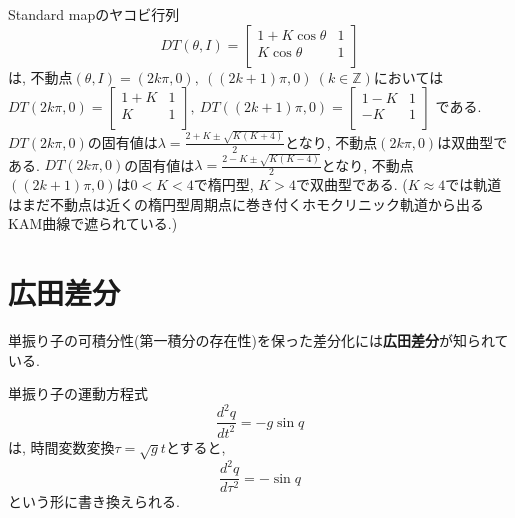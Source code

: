 \documentclass[a4paper]{ujarticle}
\numberwithin{equation}{section}
\theoremstyle{definition}
\begin{document}
    Standard mapのヤコビ行列
    \[
        DT(\theta, I) = 
        \begin{bmatrix}
            1 + K \cos{\theta} & 1 \\
            K \cos{\theta} & 1\\
        \end{bmatrix}
    \]
    は, 不動点$(\theta, I) = (2k\pi, 0), \ ((2k+1)\pi, 0) \ (k \in \mathbb{Z})$においては
    $DT(2k\pi, 0) = 
        \begin{bmatrix}
            1 + K  & 1 \\
            K & 1\\
        \end{bmatrix}, 
        \ DT((2k+1)\pi, 0) = 
        \begin{bmatrix}
            1 - K & 1 \\
            -K & 1\\
        \end{bmatrix}$
    である.
    $DT(2k\pi, 0)$の固有値は$\lambda = \frac{2 + K \pm \sqrt{K(K+4)}}{2}$となり, 
    不動点$(2k\pi, 0)$は双曲型である.
    $DT(2k\pi, 0)$の固有値は$\lambda = \frac{2 - K \pm \sqrt{K(K-4)}}{2}$となり, 
    不動点$((2k+1)\pi, 0)$は$0 < K < 4$で楕円型, $K > 4$で双曲型である.
    ($K\approx 4$では軌道はまだ不動点は近くの楕円型周期点に巻き付くホモクリニック軌道から出るKAM曲線で遮られている.)

    \section{広田差分}
    単振り子の可積分性(第一積分の存在性)を保った差分化には\textbf{広田差分}が知られている.

    単振り子の運動方程式
    \begin{equation} 
        \frac{d^2 q}{d t^2} = - g \sin{q}
    \end{equation}
    は, 時間変数変換$\tau = \sqrt{g} t$とすると,
    \begin{equation} \label{eq:pend}
        \frac{d^2 q}{d \tau^2} = - \sin{q}
    \end{equation}
    という形に書き換えられる.
\end{document}
